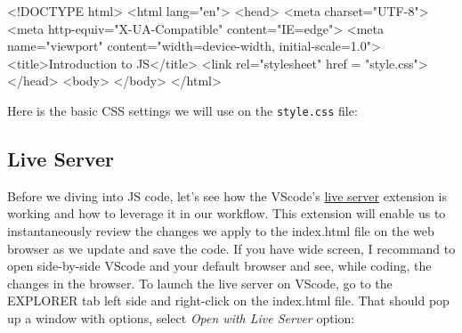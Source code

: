 \documentclass[
  letterpaper,
  DIV=11,
  numbers=noendperiod]{scrreprt}
\newenvironment{Shaded}{\begin{snugshade}}{\end{snugshade}}
\newcommand{\DataTypeTok}[1]{\textcolor[rgb]{0.68,0.00,0.00}{#1}}
\newcommand{\ErrorTok}[1]{\textcolor[rgb]{0.68,0.00,0.00}{#1}}
\newcommand{\KeywordTok}[1]{\textcolor[rgb]{0.00,0.23,0.31}{#1}}
\newcommand{\NormalTok}[1]{\textcolor[rgb]{0.00,0.23,0.31}{#1}}
\newcommand{\OtherTok}[1]{\textcolor[rgb]{0.00,0.23,0.31}{#1}}
\newcommand{\StringTok}[1]{\textcolor[rgb]{0.13,0.47,0.30}{#1}}
\begin{document}
\begin{Shaded}
\begin{Highlighting}[]
\DataTypeTok{\textless{}!DOCTYPE }\NormalTok{html}\DataTypeTok{\textgreater{}}
\KeywordTok{\textless{}html} \ErrorTok{lang}\OtherTok{=}\StringTok{"en"}\KeywordTok{\textgreater{}}
\KeywordTok{\textless{}head\textgreater{}}
    \KeywordTok{\textless{}meta} \ErrorTok{charset}\OtherTok{=}\StringTok{"UTF{-}8"}\KeywordTok{\textgreater{}}
    \KeywordTok{\textless{}meta} \ErrorTok{http{-}equiv}\OtherTok{=}\StringTok{"X{-}UA{-}Compatible"} \ErrorTok{content}\OtherTok{=}\StringTok{"IE=edge"}\KeywordTok{\textgreater{}}
    \KeywordTok{\textless{}meta} \ErrorTok{name}\OtherTok{=}\StringTok{"viewport"} \ErrorTok{content}\OtherTok{=}\StringTok{"width=device{-}width, initial{-}scale=1.0"}\KeywordTok{\textgreater{}}
    \KeywordTok{\textless{}title\textgreater{}}\NormalTok{Introduction to JS}\KeywordTok{\textless{}/title\textgreater{}}
    \KeywordTok{\textless{}link} \ErrorTok{rel}\OtherTok{=}\StringTok{"stylesheet"} \ErrorTok{href} \OtherTok{=} \StringTok{"style.css"}\KeywordTok{\textgreater{}}
\KeywordTok{\textless{}/head\textgreater{}}
\KeywordTok{\textless{}body\textgreater{}}
\KeywordTok{\textless{}/body\textgreater{}}
\KeywordTok{\textless{}/html\textgreater{}}
\end{Highlighting}
\end{Shaded}

Here is the basic CSS settings we will use on the \texttt{style.css}
file:

\begin{Shaded}
\begin{Highlighting}[]

\end{Highlighting}
\end{Shaded}

\hypertarget{live-server}{%
\subsection{Live Server}\label{live-server}}

Before we diving into JS code, let's see how the VScode's
\href{https://marketplace.visualstudio.com/items?itemName=ritwickdey.LiveServer}{live
server} extension is working and how to leverage it in our workflow.
This extension will enable us to instantaneously review the changes we
apply to the index.html file on the web browser as we update and save
the code. If you have wide screen, I recommand to open side-by-side
VScode and your default browser and see, while coding, the changes in
the browser. To launch the live server on VScode, go to the EXPLORER tab
left side and right-click on the index.html file. That should pop up a
window with options, select \emph{Open with Live Server} option:
\end{document}
